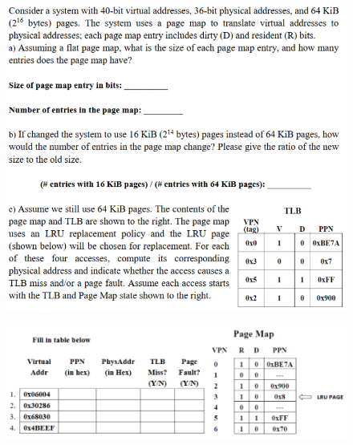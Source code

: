 \documentclass[cn,12pt]{homework}
\begin{document}
\begin{problem}
  \quad
  \begin{figure}[H]
    \centering
    \includegraphics[width=1\textwidth]{./figures/image2.png}
    \label{fig:pro1}
  \end{figure}

  \begin{figure}[H]
    \centering
    \includegraphics[width=1\textwidth]{./figures/image2_2.png}
    \label{fig:pro1}
  \end{figure}

\end{problem}
\end{document}
